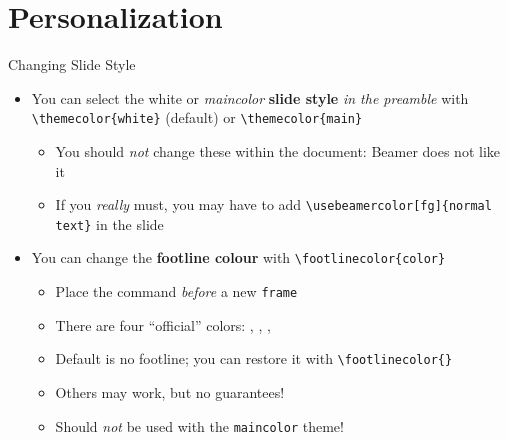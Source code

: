 \section{Personalization}

\begin{frame}[fragile]{Changing Slide Style}
\begin{itemize}
    \item You can select the white or \textit{maincolor} \textbf{slide style} \emph{in the preamble} with \verb|\themecolor{white}| (default) or \verb|\themecolor{main}|
          \begin{itemize}
              \item You should \emph{not} change these within the document: Beamer does  not like it
              \item If you \emph{really} must, you may have to add 
              \verb|\usebeamercolor[fg]{normal text}| in the slide
          \end{itemize}
    \item You can change the \textbf{footline colour} with 
    \verb|\footlinecolor{color}|
          \begin{itemize}
              \item Place the command \emph{before} a new \verb|frame|
              \item There are four ``official'' colors: 
              , , 
              , 
              \item Default is no footline; you can restore it with 
              \verb|\footlinecolor{}|
              \item Others may work, but no guarantees!
              \item Should \emph{not} be used with the \verb|maincolor| theme!
          \end{itemize}
\end{itemize}
\end{frame}


